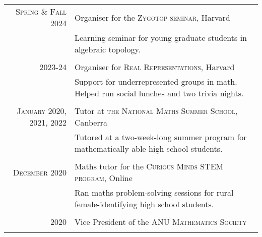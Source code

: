 \documentclass[a4paper,12pt]{article} %
\begin{document}
\begin{tabular}{r|p{12cm}}

\textsc{Spring \& Fall 2024} & Organiser for the \textsc{Zygotop seminar}, Harvard \emph{}\\
& \footnotesize{Learning seminar for young graduate students in algebraic topology.}\\
\multicolumn{2}{c}{} \\


\textsc{2023-24} & Organiser for \textsc{Real Representations}, Harvard \emph{}\\
& \footnotesize{Support for underrepresented groups in math. Helped run social lunches and two trivia nights.}\\
\multicolumn{2}{c}{} \\


\textsc{January 2020, 2021, 2022} & Tutor at \textsc{the National Maths Summer School}, Canberra \emph{}\\
& \footnotesize{Tutored at a two-week-long summer program for mathematically able high school students.}\\
\multicolumn{2}{c}{} \\


\textsc{December 2020} & Maths tutor for the \textsc{Curious Minds STEM program}, Online \emph{}\\
& \footnotesize{Ran maths problem-solving sessions for rural female-identifying high school students.}\\
\multicolumn{2}{c}{} \\


\textsc{2020} & Vice President of the \textsc{ANU Mathematics Society}\\
\multicolumn{2}{c}{} \\



\end{tabular}
\end{document}
